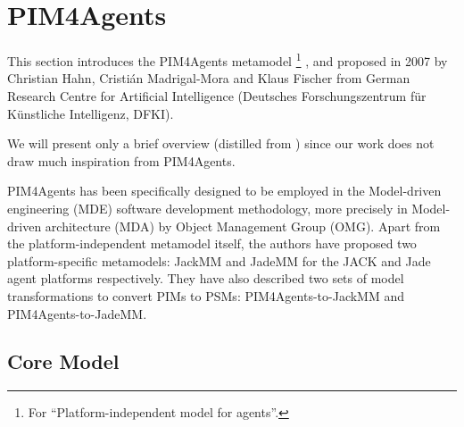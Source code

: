 
\section{PIM4Agents}

This section introduces the PIM4Agents metamodel 
\footnote{For ``Platform-independent model for agents''.}
\cite{Hahn07a}, \cite{Hahn07b} and \cite{Hahn08}
proposed in 2007 by Christian Hahn, Cristián Madrigal-Mora and Klaus Fischer from German Research Centre for Artificial Intelligence (Deutsches Forschungszentrum f\"{u}r K\"{u}nstliche Intelligenz, DFKI).

We will present only a brief overview (distilled from \cite{Hahn07b}) since our work does not draw much inspiration from PIM4Agents.


PIM4Agents has been specifically designed to be employed in the Model-driven engineering (MDE) software development methodology, more precisely in Model-driven architecture (MDA) by Object Management Group (OMG).
Apart from the platform-independent metamodel itself, the authors have proposed two platform-specific metamodels: JackMM and JadeMM for the JACK and Jade agent platforms respectively.
They have also described two sets of model transformations to convert PIMs to PSMs: PIM4Agents-to-JackMM and PIM4Agents-to-JadeMM.

\subsection*{Core Model}

